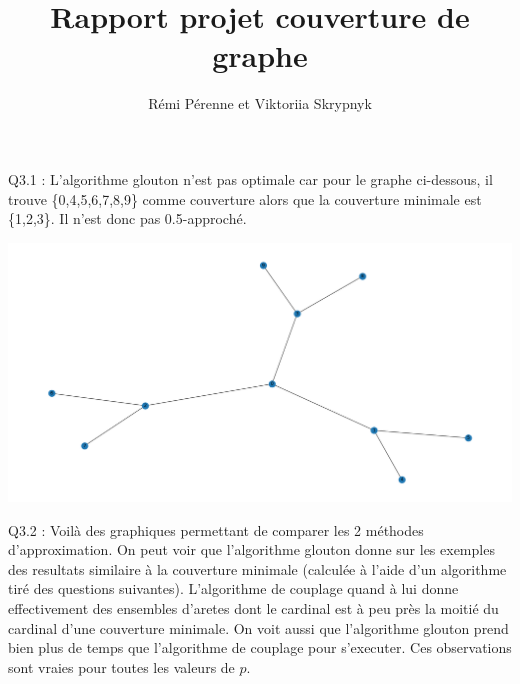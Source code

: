 \documentclass[a4paper]{article}
\begin{document}
\title{Rapport projet couverture de graphe}
\author{Rémi Pérenne et Viktoriia Skrypnyk}
\maketitle

Q3.1 :
L'algorithme glouton n'est pas optimale car pour le graphe ci-dessous, il trouve \{0,4,5,6,7,8,9\} comme couverture alors que la couverture minimale est \{1,2,3\}. Il n'est donc pas 0.5-approché.

\includegraphics[scale=0.3]{"./graphe_q31.png"}

Q3.2 :
Voilà des graphiques permettant de comparer les 2 méthodes d'approximation. On peut voir que l'algorithme glouton donne sur les exemples des resultats similaire à la couverture minimale (calculée à l'aide d'un algorithme tiré des questions suivantes). L'algorithme de couplage quand à lui donne effectivement des ensembles d'aretes dont le cardinal est à peu près la moitié du cardinal d'une couverture minimale. On voit aussi que l'algorithme glouton prend bien plus de temps que l'algorithme de couplage pour s'executer. Ces observations sont vraies pour toutes les valeurs de $p$.
\end{document}
